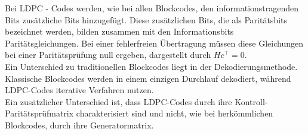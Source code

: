 \begin{Beispiel}

Bei LDPC - Codes werden, wie bei allen Blockcodes, den informationstragenden Bits zusätzliche Bits hinzugefügt. 
Diese zusätzlichen Bits, die als Paritätsbits bezeichnet werden, bilden zusammen mit den Informationsbits Paritätsgleichungen. 
Bei einer fehlerfreien Übertragung müssen diese Gleichungen bei einer  Paritätsprüfung null ergeben, dargestellt durch $Hc^\intercal=0$.\\

Ein Unterschied zu traditionellen Blockcodes liegt in der Dekodierungsmethode.
Klassische Blockcodes werden in einem einzigen Durchlauf dekodiert, während LDPC-Codes iterative Verfahren nutzen.\\

Ein zusätzlicher Unterschied ist, dass LDPC-Codes durch ihre Kontroll- Paritätsprüfmatrix charakterisiert sind und nicht, wie bei herkömmlichen Blockcodes, durch ihre Generatormatrix.
\end{Beispiel}

    